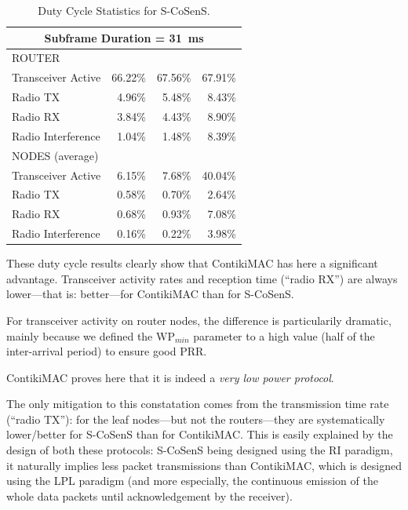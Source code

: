 \documentclass[conference]{IEEEtran}
\begin{document}
\begin{table}
\begin{tabular}{|l|r|r|r|}
\multicolumn{4}{|c|}{Subframe Duration = 31~ms}\\
\hline
 ROUTER & \multicolumn{3}{|c|}{ }\\
\hline
Transceiver Active & 66.22\% & 67.56\% & 67.91\% \\
Radio TX           &  4.96\% &  5.48\% &  8.43\% \\
Radio RX           &  3.84\% &  4.43\% &  8.90\% \\
Radio Interference &  1.04\% &  1.48\% &  8.39\% \\
\hline
 NODES (average) & \multicolumn{3}{|c|}{ }\\
\hline
Transceiver Active & 6.15\% & 7.68\% & 40.04\% \\
Radio TX           & 0.58\% & 0.70\% &  2.64\% \\
Radio RX           & 0.68\% & 0.93\% &  7.08\% \\
Radio Interference & 0.16\% & 0.22\% &  3.98\% \\

\hline
\end{tabular}
\caption{Duty Cycle Statistics for S-CoSenS.}
\label{TblDutyCyclesSCoSenS}
\end{table}

These duty cycle results clearly show that ContikiMAC has here a significant
advantage. Transceiver activity rates and reception time (``radio RX'')
are always lower---that is: better---for ContikiMAC than for S-CoSenS.

For transceiver activity on router nodes, the difference is particularily
dramatic, mainly because we defined the $\mathrm{WP}_{min}$ parameter
to a high value (half of the inter-arrival period) to ensure good PRR.

ContikiMAC proves here that it is indeed a \emph{very low power protocol}.

The only mitigation to this constatation comes from the transmission time
rate (``radio TX''): for the leaf nodes---but not the routers---they are
systematically lower/better for S-CoSenS than for ContikiMAC. This is
easily explained by the design of both these protocols: S-CoSenS being
designed using the RI paradigm, it naturally implies less packet
transmissions than ContikiMAC, which is designed using the LPL
paradigm (and more especially, the continuous emission of the
whole data packets until acknowledgement by the receiver).


\end{document}
